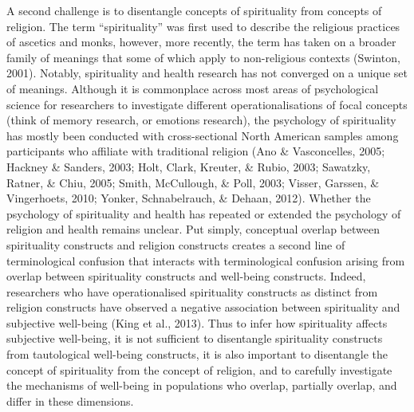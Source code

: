 \documentclass[
  english,
  man,floatsintext]{apa6}
\begin{document}
A second challenge is to disentangle concepts of spirituality from concepts of religion. The term ``spirituality'' was first used to describe the religious practices of ascetics and monks, however, more recently, the term has taken on a broader family of meanings that some of which apply to non-religious contexts (Swinton, 2001). Notably, spirituality and health research has not converged on a unique set of meanings. Although it is commonplace across most areas of psychological science for researchers to investigate different operationalisations of focal concepts (think of memory research, or emotions research), the psychology of spirituality has mostly been conducted with cross-sectional North American samples among participants who affiliate with traditional religion (Ano \& Vasconcelles, 2005; Hackney \& Sanders, 2003; Holt, Clark, Kreuter, \& Rubio, 2003; Sawatzky, Ratner, \& Chiu, 2005; Smith, McCullough, \& Poll, 2003; Visser, Garssen, \& Vingerhoets, 2010; Yonker, Schnabelrauch, \& Dehaan, 2012). Whether the psychology of spirituality and health has repeated or extended the psychology of religion and health remains unclear. Put simply, conceptual overlap between spirituality constructs and religion constructs creates a second line of terminological confusion that interacts with terminological confusion arising from overlap between spirituality constructs and well-being constructs. Indeed, researchers who have operationalised spirituality constructs as distinct from religion constructs have observed a negative association between spirituality and subjective well-being (King et al., 2013). Thus to infer how spirituality affects subjective well-being, it is not sufficient to disentangle spirituality constructs from tautological well-being constructs, it is also important to disentangle the concept of spirituality from the concept of religion, and to carefully investigate the mechanisms of well-being in populations who overlap, partially overlap, and differ in these dimensions.
\end{document}

